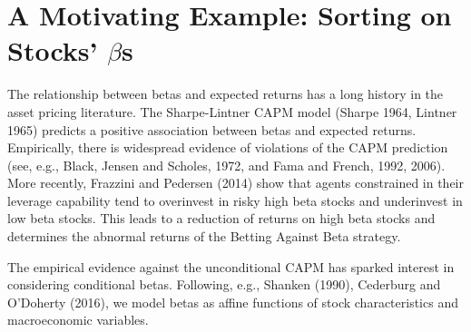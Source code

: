 
\setcounter{assumption}{0}
\setcounter{proposition}{0}

\renewcommand{\theassumption}{B\arabic{assumption}}
\renewcommand{\theproposition}{B\arabic{proposition}}

\section{A Motivating Example: Sorting on Stocks' $\beta$s}
\label{A Motivating Example: Sorting on Stocks' betas}

The relationship between betas and expected returns has a long history in the asset pricing literature. The Sharpe-Lintner CAPM model (Sharpe 1964, Lintner 1965) predicts a positive association between betas and expected returns. Empirically, there is widespread evidence of violations of the CAPM prediction (see, e.g., Black, Jensen and Scholes, 1972, and Fama and French, 1992, 2006). More recently, Frazzini and Pedersen (2014) show that agents constrained in their leverage capability tend to overinvest in risky high beta stocks and underinvest in low beta stocks. This leads to a reduction of returns on high beta stocks and determines the abnormal returns of the Betting Against Beta strategy.

The empirical evidence against the unconditional CAPM has sparked interest in considering conditional betas. Following, e.g., Shanken (1990), Cederburg and O’Doherty (2016), we model betas as affine functions of stock characteristics and macroeconomic variables.

